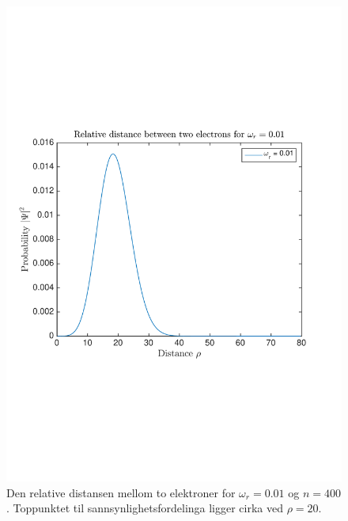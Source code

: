 \documentclass[norsk, 12pt]{article}
\theoremstyle{definition} \newtheorem{defi}{Definisjon}[subsection]
\theoremstyle{definition} \newtheorem{teo}{Teorem}[subsection]
\theoremstyle{definition} \newtheorem*{eks}{Eksempel}
\begin{document}
\begin{figure}[H]
\centering
\includegraphics[scale = 0.5, trim = 1cm 7cm 1cm 7cm]{rel_distance_omega001_n400.pdf}
\caption{Den relative distansen mellom to elektroner for $\omega_r = 0.01$ og $n = 400$. Toppunktet til sannsynlighetsfordelinga ligger cirka ved $\rho=20$.}
\label{fig:omega001}
\end{figure}
\end{document}
